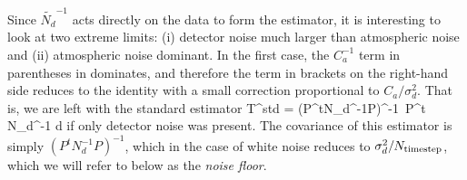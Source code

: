Since $\tilde{N_d}^{-1}$ acts directly on the data to form the estimator, it is interesting to look at two extreme limits: (i) detector noise much larger than atmospheric noise and (ii) atmospheric noise dominant. In the first case, the $C_a^{-1}$ term in parentheses in  dominates, and therefore the term in brackets on the right-hand side reduces to the identity with a small correction proportional to $C_a/\sigma_d^2$. That is, we are left with the standard estimator
\be
\hat T^{\rm std} = (P^tN_d^{-1}P)^{-1}\, P^t N_d^{-1} d 
\ee
if only detector noise was present. The covariance of this estimator is simply $(P^tN_d^{-1}P)^{-1}$, which in the case of white noise reduces to $\sigma_d^2/N_{\rm timestep}$, which we will refer to below as the {\it noise floor}.



